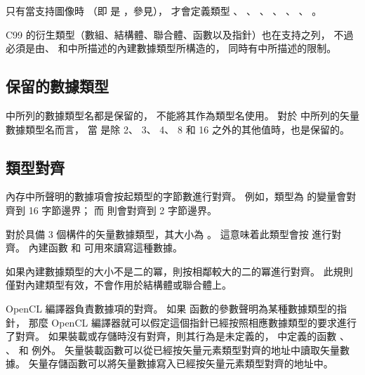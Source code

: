 只有當支持圖像時
（即  是 ，參見），
才會定義類型 、 、 、
 、 、 、
 。

C99 的衍生類型（數組、結構體、聯合體、函數以及指針）也在支持之列，
不過必須是由、
和中所描述的內建數據類型所構造的，
同時有中所描述的限制。

\subsection{保留的數據類型}

 中所列的數據類型名都是保留的，
不能將其作為類型名使用。
對於 中所列的矢量數據類型名而言，
當  是除 2、 3、 4、 8 和 16 之外的其他值時，也是保留的。


\subsection{類型對齊}

內存中所聲明的數據項會按起類型的字節數進行對齊。
例如，類型為  的變量會對齊到 16 字節邊界；
而  則會對齊到 2 字節邊界。

對於具備 3 個構件的矢量數據類型，其大小為 。
這意味着此類型會按  進行對齊。
內建函數  和  可用來讀寫這種數據。

如果內建數據類型的大小不是二的冪，則按相鄰較大的二的冪進行對齊。
此規則僅對內建類型有效，不會作用於結構體或聯合體上。

OpenCL 編譯器負責數據項的對齊。
如果  函數的參數聲明為某種數據類型的指針，
那麼 OpenCL 編譯器就可以假定這個指針已經按照相應數據類型的要求進行了對齊。
如果裝載或存儲時沒有對齊，則其行為是未定義的，
中定義的函數 、 、
  和  例外。
矢量裝載函數可以從已經按矢量元素類型對齊的地址中讀取矢量數據。
矢量存儲函數可以將矢量數據寫入已經按矢量元素類型對齊的地址中。

